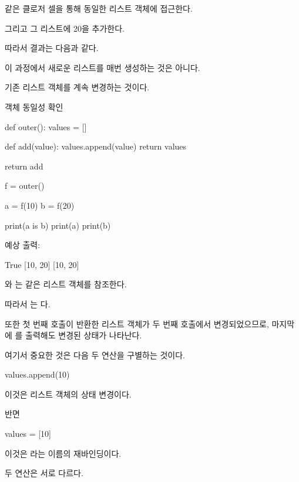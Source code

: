 같은 클로저 셀을 통해 동일한 리스트 객체에 접근한다.

그리고 그 리스트에 20을 추가한다.

따라서 결과는 다음과 같다.

\begin{dhkzsh}
[10, 20]
\end{dhkzsh}

이 과정에서 새로운 리스트를 매번 생성하는 것은 아니다.

기존 리스트 객체를 계속 변경하는 것이다.

\begin{dhknote}
\begin{dhksmry}[centered]
객체 동일성 확인
\end{dhksmry}
\end{dhknote}

\begin{dhkcode}
def outer():
    values = []

    def add(value):
        values.append(value)
        return values

    return add


f = outer()

a = f(10)
b = f(20)

print(a is b)
print(a)
print(b)
\end{dhkcode}

예상 출력:

\begin{dhkzsh}
True
[10, 20]
[10, 20]
\end{dhkzsh}

와 는 같은 리스트 객체를 참조한다.

따라서 는 다.

또한 첫 번째 호출이 반환한 리스트 객체가 두 번째 호출에서 변경되었으므로, 마지막에 를 출력해도 변경된 상태가 나타난다.

여기서 중요한 것은 다음 두 연산을 구별하는 것이다.

\begin{dhkcode}
values.append(10)
\end{dhkcode}

이것은 리스트 객체의 상태 변경이다.

반면

\begin{dhkcode}
values = [10]
\end{dhkcode}

이것은 라는 이름의 재바인딩이다.

두 연산은 서로 다르다.

